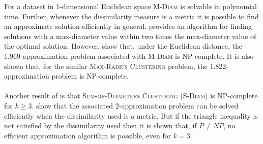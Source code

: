 For a dataset in 1-dimensional Euclidean space \textsc{M-Diam} is solvable in
polynomial time.  Further, whenever the dissimilarity measure is a metric it
is possible to find an approximate solution efficiently in general.
\citet{brucker1978complexity} provides an algorithm for finding solutions with
a max-diameter value within two times the max-diameter value of the optimal
solution.  However, \citet{bern1996approximation} show that, under the
Euclidean distance, the 1.969-approximation problem associated with
\textsc{M-Diam} is NP-complete.  It is also shown that, for the similar
\textsc{Max-Radius Clustering} problem, the 1.822-approximation problem is
NP-complete.
\\\\
\noindent Another result of \citet{brucker1978complexity} is that
\textsc{Sum-of-Diameters Clustering} (\textsc{S-Diam}) is NP-complete for $k
\geq 3$.  \citet{doddi2000approximation} show that the associated
2-approximation problem can be solved efficiently when the dissimilarity used
is a metric.  But if the triangle inequality is not satisfied by the
dissimilarity used then it is shown that, if $P \neq NP$, no efficient
approximation algorithm is possible, even for $k=3$.


